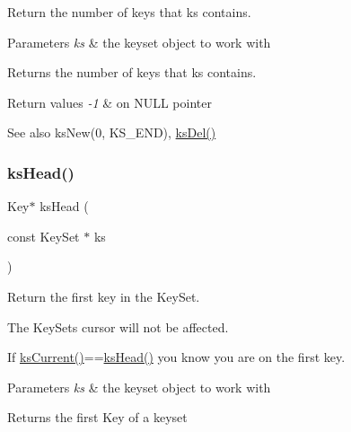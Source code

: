 Return the number of keys that {\ttfamily ks} contains. 


\begin{DoxyParams}{Parameters}
{\em ks} & the keyset object to work with \\
\hline
\end{DoxyParams}
\begin{DoxyReturn}{Returns}
the number of keys that {\ttfamily ks} contains. 
\end{DoxyReturn}

\begin{DoxyRetVals}{Return values}
{\em -\/1} & on N\+U\+LL pointer \\
\hline
\end{DoxyRetVals}
\begin{DoxySeeAlso}{See also}
ks\+New(0, K\+S\+\_\+\+E\+N\+D), \hyperlink{group__keyset_ga27e5c16473b02a422238c8d970db7ac8}{ks\+Del()} 
\end{DoxySeeAlso}
\mbox{\label{group__keyset_gae7dbf3aef70e67b5328475eb3d1f92f5}} 
\subsubsection{\texorpdfstring{ks\+Head()}{ksHead()}}
{\footnotesize\ttfamily Key$\ast$ ks\+Head (\begin{DoxyParamCaption}\item[{const Key\+Set $\ast$}]{ks }\end{DoxyParamCaption})}



Return the first key in the Key\+Set. 

The Key\+Sets cursor will not be affected.

If \hyperlink{group__keyset_ga4287b9416912c5f2ab9c195cb74fb094}{ks\+Current()}==\hyperlink{group__keyset_gae7dbf3aef70e67b5328475eb3d1f92f5}{ks\+Head()} you know you are on the first key.


\begin{DoxyParams}{Parameters}
{\em ks} & the keyset object to work with \\
\hline
\end{DoxyParams}
\begin{DoxyReturn}{Returns}
the first Key of a keyset 
\end{DoxyReturn}

